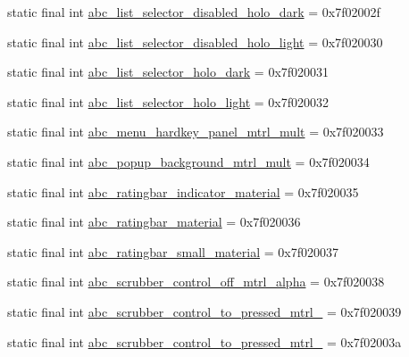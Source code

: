 \begin{CompactItemize}
\item 
static final int \hyperlink{classandroid_1_1support_1_1v4_1_1_r_1_1drawable_c7190da9cd39ea6d1466823713fa7e46}{abc\_\-list\_\-selector\_\-disabled\_\-holo\_\-dark} = 0x7f02002f
\item 
static final int \hyperlink{classandroid_1_1support_1_1v4_1_1_r_1_1drawable_42ffcf19a1528c0a0f836dba2ace8714}{abc\_\-list\_\-selector\_\-disabled\_\-holo\_\-light} = 0x7f020030
\item 
static final int \hyperlink{classandroid_1_1support_1_1v4_1_1_r_1_1drawable_dc8b6c350c0e4058e0939d3f3ed64a86}{abc\_\-list\_\-selector\_\-holo\_\-dark} = 0x7f020031
\item 
static final int \hyperlink{classandroid_1_1support_1_1v4_1_1_r_1_1drawable_19dec0fa9367686ae818651b6c77b320}{abc\_\-list\_\-selector\_\-holo\_\-light} = 0x7f020032
\item 
static final int \hyperlink{classandroid_1_1support_1_1v4_1_1_r_1_1drawable_cf335e8c03cddfbb9fb147cf9fdb2296}{abc\_\-menu\_\-hardkey\_\-panel\_\-mtrl\_\-mult} = 0x7f020033
\item 
static final int \hyperlink{classandroid_1_1support_1_1v4_1_1_r_1_1drawable_f85aa3a13572929cd9f91225667411e0}{abc\_\-popup\_\-background\_\-mtrl\_\-mult} = 0x7f020034
\item 
static final int \hyperlink{classandroid_1_1support_1_1v4_1_1_r_1_1drawable_00e4e5a5471a8e472cef6b2a743a5688}{abc\_\-ratingbar\_\-indicator\_\-material} = 0x7f020035
\item 
static final int \hyperlink{classandroid_1_1support_1_1v4_1_1_r_1_1drawable_5cd643f28073427a4e47aaf646fe7e5f}{abc\_\-ratingbar\_\-material} = 0x7f020036
\item 
static final int \hyperlink{classandroid_1_1support_1_1v4_1_1_r_1_1drawable_29f4668ce321b43ddf912c8746ada717}{abc\_\-ratingbar\_\-small\_\-material} = 0x7f020037
\item 
static final int \hyperlink{classandroid_1_1support_1_1v4_1_1_r_1_1drawable_822d0def5dd2fe569afdfdf4d7429093}{abc\_\-scrubber\_\-control\_\-off\_\-mtrl\_\-alpha} = 0x7f020038
\item 
static final int \hyperlink{classandroid_1_1support_1_1v4_1_1_r_1_1drawable_985daa0ab6ae7aadbbe9f078790541b0}{abc\_\-scrubber\_\-control\_\-to\_\-pressed\_\-mtrl\_} = 0x7f020039
\item 
static final int \hyperlink{classandroid_1_1support_1_1v4_1_1_r_1_1drawable_cb54dbb8949bbec6e64109532a23f12e}{abc\_\-scrubber\_\-control\_\-to\_\-pressed\_\-mtrl\_} = 0x7f02003a

\end{CompactItemize}
